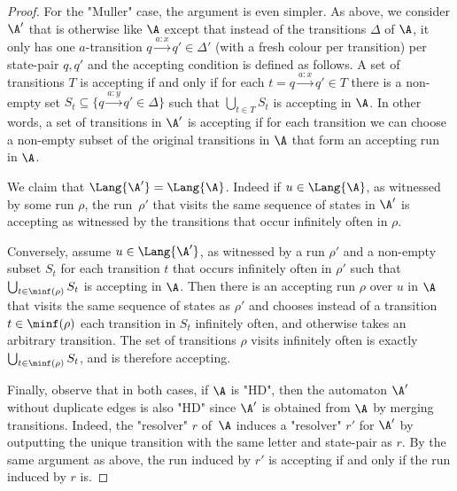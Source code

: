 \documentclass{theoretics}
\begin{document}
\begin{proof}
	For the "Muller" case, the argument is even simpler. As above, we consider $\A'$ that is otherwise like $\A$ except that instead of the transitions $\Delta$ of $\A$, it only has one $a$-transition $q\xrightarrow{a:x}q'\in \Delta'$ (with a fresh colour per transition) per state-pair $q,q'$ and the accepting condition is defined as follows. A set of  transitions $T$ is accepting if and only if for each $t=q\xrightarrow{a:x}q'\in T$ there is a non-empty set $S_t \subseteq \{ q\xrightarrow{a:y}q'\in \Delta\}$ such that $\bigcup_{t\in T} S_t$ is accepting in $\A$. In other words, a set of transitions in $\A'$ is accepting if for each transition we can choose a non-empty subset of the original transitions in $\A$ that form an accepting run in $\A$.
	
	We claim that $\Lang{\A'}=\Lang{\A}$. Indeed if $u\in \Lang{\A}$, as witnessed by some run $\rho$, the run~$\rho'$ that visits the same sequence of states in $\A'$ is accepting as witnessed by the transitions that occur infinitely often in $\rho$.
	
	Conversely, assume $u\in \Lang{\A'}$, as witnessed by a run $\rho'$ and a non-empty subset $S_t$ for each transition $t$ that occurs infinitely often in $\rho'$ such that $\bigcup_{t\in \minf(\rho)} S_t$ is accepting in $\A$. Then there is an accepting run $\rho$ over $u$ in $\A$ that visits the same sequence of states as $\rho'$ and chooses instead of a transition $t\in \minf(\rho)$ each transition in $S_t$ infinitely often, and otherwise takes an arbitrary transition. The set of transitions $\rho$ visits infinitely often is exactly $\bigcup_{t\in\minf(\rho)} S_t$, and is therefore accepting.
	
	Finally, observe that in both cases, if $\A$ is "HD", then the automaton $\A'$ without duplicate edges is also "HD" since $\A'$ is obtained from $\A$ by merging transitions. Indeed, the "resolver" $r$ of~$\A$ induces a "resolver" $r'$ for $\A'$ by outputting the unique transition with the same letter and state-pair as $r$. By the same argument as above, the run induced by $r'$ is accepting if and only if the run induced by $r$ is.
\end{proof}
\end{document}
